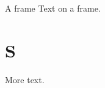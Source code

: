 \documentclass[20pt]{beamer}
\begin{document}
\begin{frame}{A frame}
Text on a frame.
\end{frame}
\section{S}
\begin{frame}
More text.
\end{frame}
\end{document}
